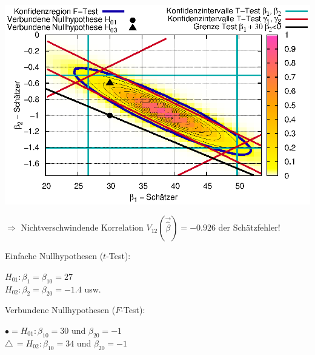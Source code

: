 \documentclass[a4paper]{foils}
\begin{document}
\begin{landscape}
\begin{center}
\newpage
\vspace{-0.3em}
\hspace{-0.15\textwidth}
\includegraphics[width=1.1\textwidth]{figsRegr/hotel_f2_hatbeta1_hatbeta2.eps}
\vspace{-1em}

{\scriptsize
$\Rightarrow$ Nichtverschwindende Korrelation $V_{12}(\vec{\hat{\beta}})=-0.926$ 
der Sch\"atzfehler!

Einfache Nullhypothesen ($t$-Test): 
\hspace{0.1\textwidth}
\parbox{0.6\textwidth}{
$H_{01}: \beta_1=\beta_{10}=27$ \\
$H_{02}: \beta_2=\beta_{20}=-1.4$ usw. 
}

Verbundene Nullhypothesen ($F$-Test):
\hspace{0.1\textwidth}
\parbox{0.6\textwidth}{
 $\bullet=H_{01}: \beta_{10}=30$ und $\beta_{20}=-1$\\
 {\scriptsize $\triangle$}\,$=H_{02}: \beta_{10}=34$ und
 $\beta_{20}=-1$
}
}



\end{center}
\end{landscape}
\end{document}
